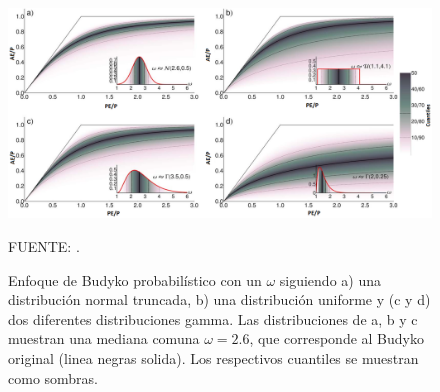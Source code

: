 \vspace{.25cm}
\begin{figure}[ht!]
\centering
	\includegraphics[scale=0.35]{Images/Greve02.png}
	\caption{Enfoque de Budyko probabilístico con un $\omega$ siguiendo a) una distribución normal truncada, b) una distribución uniforme y (c y d) dos diferentes distribuciones gamma. Las distribuciones de a, b y c muestran una mediana comuna $\omega = 2.6$, que corresponde al Budyko original (linea negras solida). Los respectivos cuantiles se muestran como sombras.}
	{\raggedright FUENTE: \citet{Greve2015}. \par}
	\label{fig:Greve02}
\end{figure}